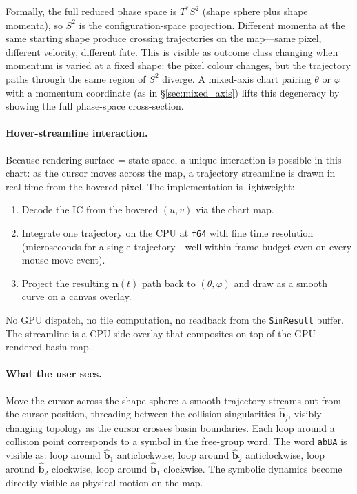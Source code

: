 \documentclass[11pt]{report}
\begin{document}
Formally, the full reduced phase space is $T^*S^2$ (shape sphere plus shape momenta), so $S^2$ is the configuration-space projection. Different momenta at the same starting shape produce crossing trajectories on the map---same pixel, different velocity, different fate. This is visible as outcome class changing when momentum is varied at a fixed shape: the pixel colour changes, but the trajectory paths through the same region of $S^2$ diverge. A mixed-axis chart pairing $\theta$ or $\varphi$ with a momentum coordinate (as in \S\ref{sec:mixed_axis}) lifts this degeneracy by showing the full phase-space cross-section.

\paragraph{Hover-streamline interaction.} Because rendering surface = state space, a unique interaction is possible in this chart: as the cursor moves across the map, a trajectory streamline is drawn in real time from the hovered pixel. The implementation is lightweight:
\begin{enumerate}[nosep]
\item Decode the IC from the hovered $(u,v)$ via the chart map.
\item Integrate one trajectory on the CPU at \texttt{f64} with fine time resolution (microseconds for a single trajectory---well within frame budget even on every mouse-move event).
\item Project the resulting $\mathbf n(t)$ path back to $(\theta,\varphi)$ and draw as a smooth curve on a canvas overlay.
\end{enumerate}
No GPU dispatch, no tile computation, no readback from the \texttt{SimResult} buffer. The streamline is a CPU-side overlay that composites on top of the GPU-rendered basin map.

\paragraph{What the user sees.} Move the cursor across the shape sphere: a smooth trajectory streams out from the cursor position, threading between the collision singularities $\hat{\mathbf b}_j$, visibly changing topology as the cursor crosses basin boundaries. Each loop around a collision point corresponds to a symbol in the free-group word. The word \texttt{abBA} is visible as: loop around $\hat{\mathbf b}_1$ anticlockwise, loop around $\hat{\mathbf b}_2$ anticlockwise, loop around $\hat{\mathbf b}_2$ clockwise, loop around $\hat{\mathbf b}_1$ clockwise. The symbolic dynamics become directly visible as physical motion on the map.
\end{document}
